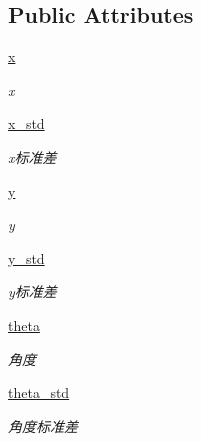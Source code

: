 \subsection*{Public Attributes}
\begin{DoxyCompactItemize}
\item 
\hyperlink{classfuse___g___a__dox_1_1_a_m_c_l__unit_a5416909880bfcca6e4e21e29d16c26ea}{x}
\begin{DoxyCompactList}\small\item\em x \end{DoxyCompactList}\item 
\hyperlink{classfuse___g___a__dox_1_1_a_m_c_l__unit_ab590d3a831818918e3550148f66df9c0}{x\+\_\+std}
\begin{DoxyCompactList}\small\item\em x标准差 \end{DoxyCompactList}\item 
\hyperlink{classfuse___g___a__dox_1_1_a_m_c_l__unit_a53a9fa8b7cd9bfbf6b95dabb2fc83911}{y}
\begin{DoxyCompactList}\small\item\em y \end{DoxyCompactList}\item 
\hyperlink{classfuse___g___a__dox_1_1_a_m_c_l__unit_a922c7d12c024daf8ee9525747e6e0be5}{y\+\_\+std}
\begin{DoxyCompactList}\small\item\em y标准差 \end{DoxyCompactList}\item 
\hyperlink{classfuse___g___a__dox_1_1_a_m_c_l__unit_a1f21da0a1e646c77db981d9d76fabbf0}{theta}
\begin{DoxyCompactList}\small\item\em 角度 \end{DoxyCompactList}\item 
\hyperlink{classfuse___g___a__dox_1_1_a_m_c_l__unit_a34e65602f6715ba33b86b17e5b61c4c6}{theta\+\_\+std}
\begin{DoxyCompactList}\small\item\em 角度标准差 \end{DoxyCompactList}\end{DoxyCompactItemize}
